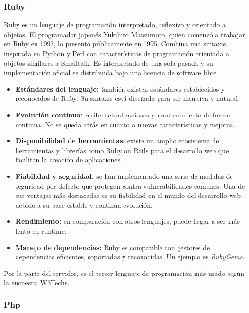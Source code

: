 \subsubsection{Ruby}

Ruby es un lenguaje de programación interpretado, reflexivo y orientado a objetos. El programador japonés Yukihiro Matsumoto, quien comenzó a trabajar en Ruby en 1993, lo presentó públicamente en 1995. Combina una sintaxis inspirada en Python y Perl con características de programación orientada a objetos similares a Smalltalk. Es interpretado de una sola pasada y su implementación oficial es distribuida bajo una licencia de software libre~\cite{ruby-wiki}.

\begin{itemize}
    \item[\bien] \textbf{Estándares del lenguaje:} también existen estándares establecidos y reconocidos de Ruby. Su sintaxis está diseñada para ser intuitiva y natural.
    \item[\bien] \textbf{Evolución continua:} recibe actualizaciones y mantenimiento de forma continua. No se queda atrás en cuanto a nuevas características y mejoras.
    \item[\bien] \textbf{Disponibilidad de herramientas:} existe un amplio ecosistema de herramientas y librerías como Ruby on Rails para el desarrollo web que facilitan la creación de aplicaciones.
    \item[\bien] \textbf{Fiabilidad y seguridad:} se han implementado una serie de medidas de seguridad por defecto que protegen contra vulnerabilidades comunes. Una de sus ventajas más destacadas es su fiabilidad en el mundo del desarrollo web debido a su base estable y continua evolución.
    \item[\regular] \textbf{Rendimiento:} en comparación con otros lenguajes, puede llegar a ser más lento en runtime.
    \item[\bien] \textbf{Manejo de dependencias:} Ruby es compatible con gestores de dependencias eficientes, soportadas y reconocidas. Un ejemplo es \textit{RubyGems}. 
\end{itemize}

Por la parte del servidor, es el tercer lenguaje de programación más usado según la encuesta~\href{https://w3techs.com/technologies/overview/programming_language}{W3Techs}.

\subsubsection{Php}

